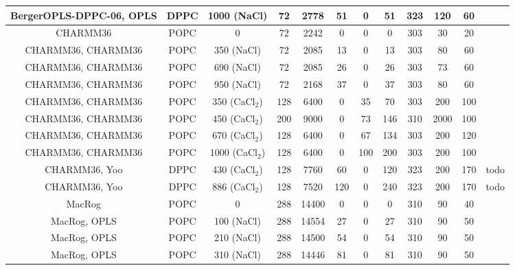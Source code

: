 \documentclass[pre,aps,floatfix,authordate1-4,twocolumn]{revtex4-1}
\begin{document}
\begin{table}[htb]
\begin{tabular}{c c c c c c c c c c c c}
  BergerOPLS-DPPC-06\cite{tieleman06}, OPLS\cite{aqvist90} &   DPPC & 1000 (NaCl) & 72 & 2778 & 51  & 0  & 51 &323  & 120 & 60 &\cite{bergerOPLSDPPCfiles1000mMnacl} \\
  \hline
  CHARMM36\cite{klauda10}   & POPC & 0           & 72 & 2242 & 0  & 0 & 0 & 303  & 30 & 20 & \cite{charmm36filesSHORT} \\
  CHARMM36\cite{klauda10}, CHARMM36\cite{venable13} & POPC & 350 (NaCl)  & 72 & 2085 & 13  & 0 & 13 & 303  & 80 & 60 & \cite{charmmPOPC350mMNaClfiles} \\
  CHARMM36\cite{klauda10}, CHARMM36\cite{venable13} & POPC & 690 (NaCl)  & 72 & 2085 & 26  & 0 & 26 & 303  & 73 & 60 & \cite{charmmPOPC690mMNaClfiles}   \\
  CHARMM36\cite{klauda10}, CHARMM36\cite{venable13}  & POPC & 950 (NaCl)  & 72 & 2168 & 37  & 0 & 37 & 303  & 80 & 60 &\cite{charmmPOPC950mMNaClfiles}  \\
  CHARMM36\cite{klauda10}, CHARMM36 & POPC &  350 (CaCl$_2$)  & 128 & 6400 & 0& 35 & 70 & 303  & 200  & 100 & \cite{charmmPOPC350mMCaClfiles}  \\
  CHARMM36\cite{klauda10}, CHARMM36 & POPC &  450 (CaCl$_2$)  & 200 & 9000 & 0& 73 & 146 & 310  & 2000  & 100 & \cite{charmmPOPC450mMCaClfiles}  \\
  CHARMM36\cite{klauda10}, CHARMM36 & POPC &  670 (CaCl$_2$)  & 128 & 6400 & 0& 67 & 134 & 303  & 200  & 120 & \cite{charmmPOPC670mMCaClfiles}  \\  
  CHARMM36\cite{klauda10}, CHARMM36 & POPC &  1000 (CaCl$_2$) & 128 & 6400 & 0& 100 & 200 & 303 & 200  & 100 & \cite{charmmPOPC1000mMCaClfiles}  \\
  \hline
  CHARMM36\cite{klauda10}, Yoo\cite{yoo16}  & DPPC & 430 (CaCl$_2$)  & 128 & 7760 & 60  & 0 & 120 & 323  & 200 & 170 &todo  \\
  CHARMM36\cite{klauda10}, Yoo\cite{yoo16}  & DPPC & 886 (CaCl$_2$)  & 128 & 7520 & 120  & 0 & 240 & 323  & 200 & 170 &todo  \\
  \hline
  MacRog\cite{maciejewski14}  & POPC & 0 & 288 & 14400 & 0 & 0 & 0 & 310 & 90&40  &~\cite{macrogdehydFILES}  \\
  MacRog\cite{maciejewski14}, OPLS\cite{aqvist90}  & POPC & 100 (NaCl) & 288 & 14554 & 27 & 0 & 27 & 310 & 90&50  & \cite{macrogIONfiles} \\
  MacRog\cite{maciejewski14}, OPLS\cite{aqvist90}  & POPC &  210 (NaCl) & 288 & 14500 & 54 & 0 & 54 & 310 & 90&50  &\cite{macrogIONfiles}  \\
  MacRog\cite{maciejewski14}, OPLS\cite{aqvist90}  & POPC &   310 (NaCl) & 288 & 14446 & 81 & 0 & 81 & 310 & 90&50  & \cite{macrogIONfiles} \\

\end{tabular}
\end{table}
\end{document}
